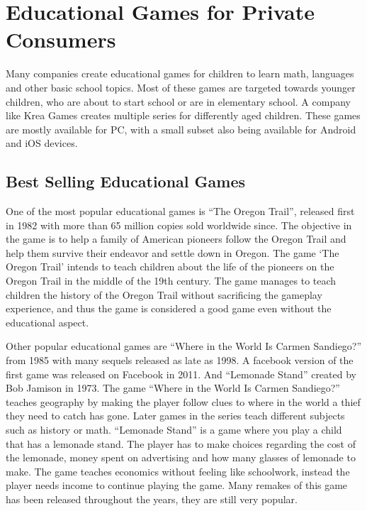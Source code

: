 \section{Educational Games for Private Consumers}
\label{sec:privateconsumers}
Many companies create educational games for children to learn math, languages and other basic school topics. Most of these games are targeted towards younger children, who are about to start school or are in elementary school. A company like Krea Games \cite{kreagames} creates multiple series for differently aged children. These games are mostly available for PC, with a small subset also being available for Android and iOS devices.

\subsection{Best Selling Educational Games}
One of the most popular educational games is ``The Oregon Trail'', released first in 1982 with more than 65 million copies sold worldwide since.\cite{oregontrail} The objective in the game is to help a family of American pioneers follow the Oregon Trail and help them survive their endeavor and settle down in Oregon.
The game `The Oregon Trail' intends to teach children about the life of the pioneers on the Oregon Trail in the middle of the 19th century. The game manages to teach children the history of the Oregon Trail without sacrificing the gameplay experience, and thus the game is considered a good game even without the educational aspect.

Other popular educational games are ``Where in the World Is Carmen Sandiego?'' from 1985 with many sequels released as late as 1998.\cite{carmensandiego} A facebook version of the first game was released on Facebook in 2011. And ``Lemonade Stand'' created by Bob Jamison in 1973.\cite{lemonadestand}
The game ``Where in the World Is Carmen Sandiego?'' teaches geography by making the player follow clues to where in the world a thief they need to catch has gone. Later games in the series teach different subjects such as history or math.
``Lemonade Stand'' is a game where you play a child that has a lemonade stand. The player has to make choices regarding the cost of the lemonade, money spent on advertising and how many glasses of lemonade to make. The game teaches economics without feeling like schoolwork, instead the player needs income to continue playing the game. Many remakes of this game has been released throughout the years, they are still very popular.

